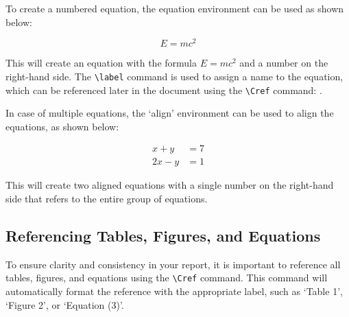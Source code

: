 \documentclass{article}
\begin{document}
To create a numbered equation, the equation environment can be used as shown below:

\begin{equation}
  E = mc^2
  \label{eq:mass-energy}
\end{equation}

This will create an equation with the formula $E = mc^2$ and a number on the right-hand side. The \verb+\label+ command is used to assign a name to the equation, which can be referenced later in the document using the \verb+\Cref+ command: .



In case of multiple equations, the `align' environment can be used to align the equations, as shown below:

\begin{align}
  x + y &= 7  \nonumber \\ 
  2x - y &= 1
\end{align}


This will create two aligned equations with a single number on the right-hand side that refers to the entire group of equations.


\subsection{Referencing Tables, Figures, and Equations}

To ensure clarity and consistency in your report, it is important to reference all tables, figures, and equations using the \verb+\Cref+ command. This command will automatically format the reference with the appropriate label, such as `Table 1', `Figure 2',  or `Equation (3)'.







\end{document}
